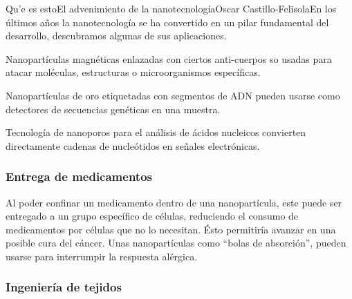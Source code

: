 \begin{Artikel}{Qu'e es esto}{El advenimiento de la nanotecnolog\'ia}{Oscar Castillo-Felisola}{En los \'ultimos a\~nos la nanotecnolog\'ia se ha convertido en un pilar fundamental del desarrollo, descubramos algunas de sus aplicaciones.}

Nanopart\'iculas magn\'eticas enlazadas con ciertos anti-cuerpos so usadas para atacar mol\'eculas, estructuras o microorganismos  espec\'ificas.

Nanopart\'iculas de oro etiquetadas con segmentos de ADN pueden usarse como detectores de secuencias gen\'eticas en una muestra.

Tecnolog\'ia de nanoporos para el an\'alisis de \'acidos nucleicos convierten directamente cadenas de nucle\'otidos en se\~nales electr\'onicas.






\subsubsection*{Entrega de medicamentos}


Al poder confinar un medicamento dentro de una nanopart\'icula, este puede ser entregado a un grupo espec\'ifico de c\'elulas, reduciendo el consumo de medicamentos por c\'elulas que no lo necesitan. \'Esto permitir\'ia avanzar en una posible %
cura del c\'ancer.
Unas nanopart\'iculas como ``bolas de absorci\'on'', pueden usarse para interrumpir la respuesta al\'ergica. 

\subsubsection*{Ingenier\'ia de tejidos}


\end{Artikel}
